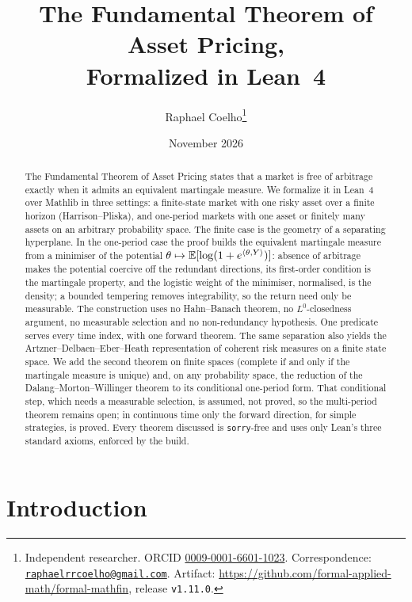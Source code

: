 \documentclass[11pt]{article}
\title{The Fundamental Theorem of Asset Pricing,\\ Formalized in Lean~4}
\author{Raphael Coelho\thanks{Independent researcher. ORCID
  \href{https://orcid.org/0009-0001-6601-1023}{0009-0001-6601-1023}.
  Correspondence: \href{mailto:raphaelrrcoelho@gmail.com}{\texttt{raphaelrrcoelho@gmail.com}}.
  Artifact: \url{https://github.com/formal-applied-math/formal-mathfin}, release \texttt{v1.11.0}.}}
\date{November 2026}
\begin{document}
\maketitle

\begin{abstract}
\noindent
The Fundamental Theorem of Asset Pricing states that a market is free of arbitrage exactly when it
admits an equivalent martingale measure. We formalize it in Lean~4 over Mathlib in three settings: a
finite-state market with one risky asset over a finite horizon (Harrison--Pliska), and one-period markets
with one asset or finitely many assets on an arbitrary probability space. The finite case is the geometry
of a separating hyperplane. In the one-period case the proof builds the equivalent martingale
measure from a minimiser of the potential $\theta\mapsto\mathbb{E}[\log(1+e^{\langle\theta,Y\rangle})]$: absence of
arbitrage makes the potential coercive off the redundant directions, its first-order condition is the
martingale property, and the logistic weight of the minimiser, normalised, is the density; a bounded
tempering removes integrability, so the return need only be measurable. The construction uses no
Hahn--Banach theorem, no $L^0$-closedness argument, no measurable selection and no non-redundancy
hypothesis. One predicate serves every time index, with one forward theorem. The same separation also yields the Artzner--Delbaen--Eber--Heath representation of coherent risk
measures on a finite state space. We add the second theorem on finite spaces (complete if and only if
the martingale measure is unique) and, on any probability space, the reduction of the
Dalang--Morton--Willinger theorem to its conditional one-period form. That conditional step, which
needs a measurable selection, is assumed, not proved, so the multi-period theorem remains open; in continuous time
only the forward direction, for simple strategies, is proved. Every theorem discussed is \texttt{sorry}-free and
uses only Lean's three standard axioms, enforced by the build.
\end{abstract}

\section{Introduction}
\end{document}
